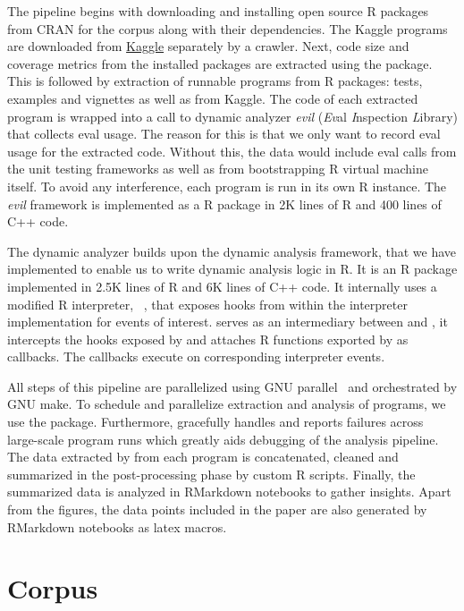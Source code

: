 \documentclass[conference]{IEEEtran}
\begin{document}
The pipeline begins with downloading and installing open source R packages
from CRAN for the corpus along with their dependencies. The Kaggle programs
are downloaded from \href{http://www.kaggle.com}{Kaggle} separately by a
crawler.  Next, code size and coverage metrics from the installed packages
are extracted using the \href{ https://github.com/r-lib/covr}{\covr}
package. This is followed by extraction of runnable programs from R
packages: tests, examples and vignettes as well as from Kaggle. The code of
each extracted program is wrapped into a call to dynamic analyzer
\emph{evil} (\emph{Ev}al \emph{I}nspection \emph{L}ibrary) that collects eval
usage. The reason for this is that we only want to record eval usage for the
extracted code. Without this, the data would include eval calls from the
unit testing frameworks as well as from bootstrapping R virtual machine
itself. To avoid any interference, each program is run in its own R
instance. The \emph{evil} framework is implemented as a R package in 2K lines of
R and 400 lines of C++ code.

The dynamic analyzer builds upon the dynamic analysis framework, \instrumentr
that we have implemented to enable us to write dynamic analysis logic in R. It
is an R package implemented in 2.5K lines of R and 6K lines of C++ code. It
internally uses a modified R interpreter, \rdyntrace~\cite{oopsla19a}, that
exposes hooks from within the interpreter implementation for events of interest.
\instrumentr serves as an intermediary between \rdyntrace and \evil, it
intercepts the hooks exposed by \rdyntrace and attaches R functions exported by
\evil as callbacks. The \evil callbacks execute on corresponding interpreter
events.

All steps of this pipeline are parallelized using GNU
parallel~\cite{GNUparallel} and orchestrated by GNU make. To schedule and
parallelize extraction and analysis of programs, we use the \runr
package. Furthermore, \runr gracefully handles and reports failures across
large-scale program runs which greatly aids debugging of the analysis
pipeline.  The data extracted by \evil from each program is concatenated,
cleaned and summarized in the post-processing phase by custom R
scripts. Finally, the summarized data is analyzed in RMarkdown notebooks to
gather insights. Apart from the figures, the data points included in the
paper are also generated by RMarkdown notebooks as latex macros.

\section{Corpus}
\end{document}
